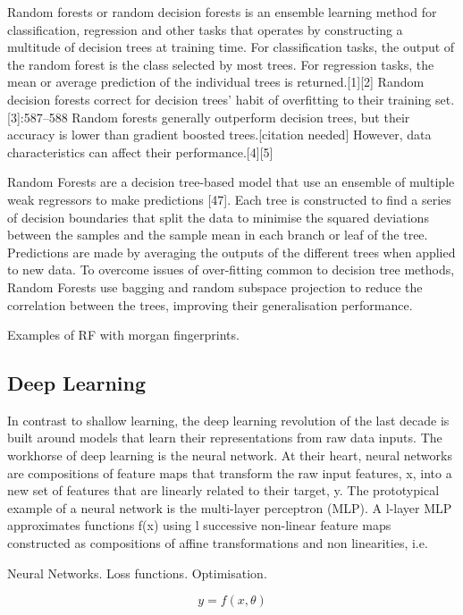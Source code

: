 Random forests or random decision forests is an ensemble learning method for classification, regression and other tasks that operates by constructing a multitude of decision trees at training time. For classification tasks, the output of the random forest is the class selected by most trees. For regression tasks, the mean or average prediction of the individual trees is returned.[1][2] Random decision forests correct for decision trees' habit of overfitting to their training set.[3]:587–588 Random forests generally outperform decision trees, but their accuracy is lower than gradient boosted trees.[citation needed] However, data characteristics can affect their performance.[4][5]

Random Forests are a decision tree-based model that use an ensemble of multiple weak regressors to make predictions [47]. Each tree is constructed to find a series of decision boundaries that split the data to minimise the squared deviations between the samples and the sample mean in each branch or leaf of the tree. Predictions are made by averaging the outputs of the different trees when applied to new data. To overcome issues of over-fitting common to decision tree methods, Random Forests use bagging and random subspace projection to reduce the correlation between the trees, improving their generalisation performance.

Examples of RF with morgan fingerprints.
\subsection{Deep Learning}

In contrast to shallow learning, the deep learning revolution of the last decade is built around models that learn their representations from raw data inputs. The workhorse of deep learning is the neural network. At their heart, neural networks are compositions of feature maps that transform the raw input features, x, into a new set of features that are linearly related to their target, y. The prototypical example of a neural network is the multi-layer perceptron (MLP). A l-layer MLP approximates functions f(x) using l successive non-linear feature maps constructed as compositions of affine transformations and non linearities, i.e.

Neural Networks. Loss functions. Optimisation.

\begin{equation}
    y = f(x, \theta)
\end{equation}

